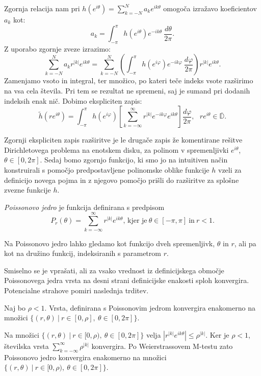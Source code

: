 \documentclass[mat1]{fmfdelo}
\begin{document}
        Zgornja relacija nam pri $h(e^{i\theta}) = \sum_{k = -N}^{N}{a_k e^{ik\theta}}$ omogoča izražavo koeficientov $a_k$ kot:
        $$
            a_ k = \int_{-\pi}^{\pi}{h \left(e^{i\theta}\right)e^{-ik\theta}~\frac{d\theta}{2\pi}}.
        $$
    Z uporabo zgornje zveze izrazimo:
    $$
        \sum_{k = - N}^{N}{ a_k r^{|k|}e^{ik\theta}} = \sum_{k = - N}^{N} \left(\int_{-\pi}^{\pi}{h(e^{i \varphi}) e^{- i k \varphi}~\frac{d \varphi}{2 \pi}}\right) r^{|k|} e^{i k \theta}.
    $$
    Zamenjamo vsoto in integral, ter množico, po kateri teče indeks vsote razširimo na vsa cela števila. Pri tem se rezultat ne spremeni, saj je sumand pri dodanih indeksih enak nič. Dobimo ekspliciten zapis:
    \begin{equation}
        \label{int1}
        \widetilde{h}(r e^{i \theta}) = \int_{-\pi}^{\pi}{h(e^{i \varphi}) \left[\sum_{k = - \infty}^{\infty} r^{|k|} e^{- i k \varphi} e^{i k \theta} \right] \frac{d \varphi}{2 \pi}}, ~~~ r e^{i\theta} \in \overline{\mathbb{D}}.
    \end{equation}

    Zgornji ekspliciten zapis razširitve je le drugače zapis že komentirane rešitve Dirichletovega problema na enotskem disku, za polinom v spremenljivki $e^{i \theta}$, $\theta \in [0,2\pi]$.
    Sedaj bomo zgornjo funkcijo, ki smo jo na intuitiven način konstruirali s pomočjo predpostavljene polinomske oblike funkcije $h$ vzeli za definicijo novega pojma in z njegovo pomočjo prišli do razširitve za splošne zvezne funkcije $h$.
    \begin{definicija}
        \emph{Poissonovo jedro} je funkcija definirana s predpisom
        $$
           P_r(\theta) = \sum_{k = -\infty}^{\infty}{r^{|k|} e^{i k \theta}}\text{, kjer je}~\theta \in [-\pi, \pi]~\text{in}~ r < 1.
        $$
    \end{definicija}
    \begin{opomba}
        Na Poissonovo jedro lahko gledamo kot funkcijo dveh spremenljivk, $\theta$ in $r$, ali pa kot na družino funkcij, indeksiranih s parametrom $r$.
    \end{opomba}

    Smiselno se je vprašati, ali za vsako vrednost iz definicijskega območje Poissonovega jedra vrsta na desni strani definicijske enakosti sploh konvergira. Potencialne strahove pomiri naslednja trditev.
    
    \begin{trditev}
        Naj bo $\rho < 1$. Vrsta, definirana s Poissonovim jedrom konvergira enakomerno na množici $\{(r,\theta)~|~r \in [0,\rho],~ \theta \in [0,2\pi]\}$.
    \end{trditev}
    \begin{dokaz}
        Na množici $\{(r,\theta)~|~r \in [0,\rho),~ \theta \in [0,2\pi]\}$ velja $|r^{|k|} e^{i k \theta}| \leq \rho^{|k|}$. Ker je $\rho < 1$, številska vrsta $\sum_{k = -\infty}^{\infty}{\rho ^{|k|}}$ konvergira. 
        Po Weierstrassovem M-testu zato Poissonovo jedro konvergira enakomerno na množici $\{(r,\theta)~|~r \in [0,\rho),~ \theta \in [0,2\pi]\}$.
    \end{dokaz}
\end{document}
